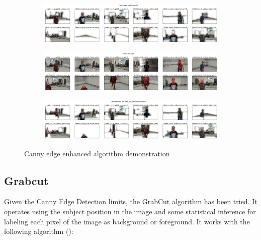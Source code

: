 \begin{figure}[!h]
	\begin{center}
		\begin{subfigure}[h]{1\textwidth}
			\centering
			\includegraphics[width=1\textwidth]{"contents/images/04-1canny-enhance-1"}
		\end{subfigure}
		\vfill
		\begin{subfigure}[h]{1\textwidth}
			\centering
			\includegraphics[width=1\textwidth]{"contents/images/04-1canny-enhance-2"}
		\end{subfigure}
		\vfill
		\begin{subfigure}[h]{1\textwidth}
			\centering
			\includegraphics[width=1\textwidth]{"contents/images/04-1canny-enhance-3"}
		\end{subfigure}
	\end{center}
	\vspace{-0.5cm}
	\caption[Canny edge enhanced algorithm demonstration]{Canny edge enhanced algorithm demonstration}
	\label{fig:canny-enanhced}
\end{figure}



\subsection{Grabcut}
\label{subsec:masking-grabcut}

Given the Canny Edge Detection limits, the GrabCut algorithm has been tried. It operates using the subject position in the image and some statistical inference for labeling each pixel of the image as background or foreground. It works with the following algorithm (\cite{opencv_grabcut}):

